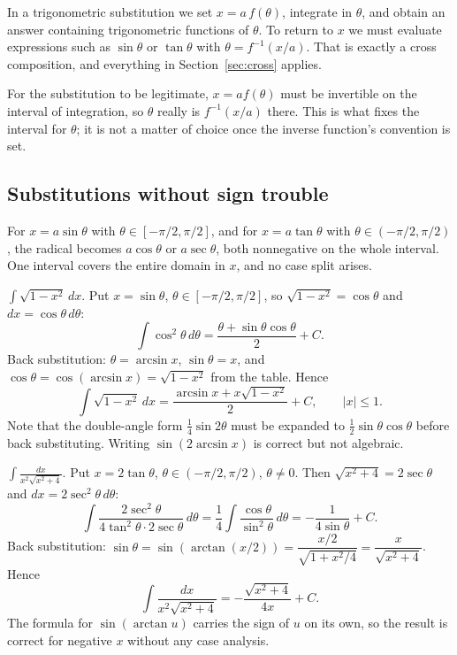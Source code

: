 \documentclass{essay}
\begin{document}
In a trigonometric substitution we set $x = a\,f(\theta)$, integrate in
$\theta$, and obtain an answer containing trigonometric functions of
$\theta$. To return to $x$ we must evaluate expressions such as
$\sin\theta$ or $\tan\theta$ with $\theta = f^{-1}(x/a)$. That is exactly
a cross composition, and everything in Section~\ref{sec:cross} applies.

For the substitution to be legitimate, $x = a f(\theta)$ must be
invertible on the interval of integration, so $\theta$ really is
$f^{-1}(x/a)$ there. This is what fixes the interval for $\theta$; it is
not a matter of choice once the inverse function's convention is set.

\subsection{Substitutions without sign trouble}

For $x = a\sin\theta$ with $\theta \in [-\pi/2, \pi/2]$, and for
$x = a\tan\theta$ with $\theta \in (-\pi/2, \pi/2)$, the radical becomes
$a\cos\theta$ or $a\sec\theta$, both nonnegative on the whole interval.
One interval covers the entire domain in $x$, and no case split arises.

\begin{example}
$\displaystyle\int \sqrt{1 - x^2}\,dx$. Put $x = \sin\theta$,
$\theta \in [-\pi/2, \pi/2]$, so $\sqrt{1 - x^2} = \cos\theta$ and
$dx = \cos\theta\,d\theta$:
\[
\int \cos^2\theta\,d\theta
= \frac{\theta + \sin\theta\cos\theta}{2} + C.
\]
Back substitution: $\theta = \arcsin x$, $\sin\theta = x$, and
$\cos\theta = \cos(\arcsin x) = \sqrt{1 - x^2}$ from the table. Hence
\[
\int \sqrt{1 - x^2}\,dx = \frac{\arcsin x + x\sqrt{1 - x^2}}{2} + C,
\qquad |x| \le 1.
\]
Note that the double-angle form $\tfrac14 \sin 2\theta$ must be expanded
to $\tfrac12\sin\theta\cos\theta$ before back substituting. Writing
$\sin(2\arcsin x)$ is correct but not algebraic.
\end{example}

\begin{example}
$\displaystyle\int \frac{dx}{x^2\sqrt{x^2 + 4}}$. Put $x = 2\tan\theta$,
$\theta \in (-\pi/2, \pi/2)$, $\theta \ne 0$. Then
$\sqrt{x^2 + 4} = 2\sec\theta$ and $dx = 2\sec^2\theta\,d\theta$:
\[
\int \frac{2\sec^2\theta}{4\tan^2\theta \cdot 2\sec\theta}\,d\theta
= \frac14 \int \frac{\cos\theta}{\sin^2\theta}\,d\theta
= -\frac{1}{4\sin\theta} + C.
\]
Back substitution: $\sin\theta = \sin(\arctan(x/2)) = \dfrac{x/2}{\sqrt{1
+ x^2/4}} = \dfrac{x}{\sqrt{x^2 + 4}}$. Hence
\[
\int \frac{dx}{x^2\sqrt{x^2 + 4}} = -\frac{\sqrt{x^2 + 4}}{4x} + C.
\]
The formula for $\sin(\arctan u)$ carries the sign of $u$ on its own, so
the result is correct for negative $x$ without any case analysis.
\end{example}
\end{document}
